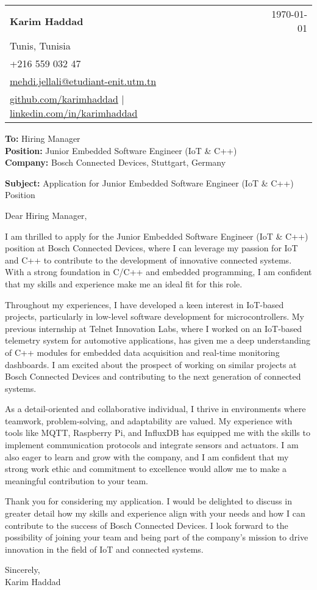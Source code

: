 \documentclass[letterpaper,11pt]{article}
\makeatletter
\newcommand{\letterHeading}[5]{
    \begin{tabular*}{\textwidth}{l@{\extracolsep{\fill}}r}
    \textbf{\Large #1} & #5 \\  %
    #2 & \\
    #3 & \\
    #4 & \\
    \end{tabular*}
    \vspace{15pt}
}
\newcommand{\letterRecipient}[3]{
    \textbf{\large To:} #1 \\
    \textbf{\large Position:} #2 \\
    \textbf{\large Company:} #3 \\
    \vspace{12pt}
}
\newcommand{\letterSubject}[1]{
    \textbf{\large Subject:} #1 \\
    \vspace{15pt}
}
\makeatother
\begin{document}
    \letterHeading
    {Karim Haddad}
    {Tunis, Tunisia}
    {+216 559 032 47 \\ \href{mailto:mehdi.jellali@etudiant-enit.utm.tn}{mehdi.jellali@etudiant-enit.utm.tn}}
    {\href{https://github.com/karimhaddad}{github.com/karimhaddad} $|$ \href{https://www.linkedin.com/in/karimhaddad}{linkedin.com/in/karimhaddad}}
    {\today}

    \letterRecipient
    {Hiring Manager}
    {Junior Embedded Software Engineer (IoT & C++)}
    {Bosch Connected Devices, Stuttgart, Germany}

    \letterSubject{Application for Junior Embedded Software Engineer (IoT & C++) Position}

    Dear Hiring Manager,

    I am thrilled to apply for the Junior Embedded Software Engineer (IoT & C++) position at Bosch Connected Devices, where I can leverage my passion for IoT and C++ to contribute to the development of innovative connected systems. With a strong foundation in C/C++ and embedded programming, I am confident that my skills and experience make me an ideal fit for this role.

    Throughout my experiences, I have developed a keen interest in IoT-based projects, particularly in low-level software development for microcontrollers. My previous internship at Telnet Innovation Labs, where I worked on an IoT-based telemetry system for automotive applications, has given me a deep understanding of C++ modules for embedded data acquisition and real-time monitoring dashboards. I am excited about the prospect of working on similar projects at Bosch Connected Devices and contributing to the next generation of connected systems.

    As a detail-oriented and collaborative individual, I thrive in environments where teamwork, problem-solving, and adaptability are valued. My experience with tools like MQTT, Raspberry Pi, and InfluxDB has equipped me with the skills to implement communication protocols and integrate sensors and actuators. I am also eager to learn and grow with the company, and I am confident that my strong work ethic and commitment to excellence would allow me to make a meaningful contribution to your team.

    Thank you for considering my application. I would be delighted to discuss in greater detail how my skills and experience align with your needs and how I can contribute to the success of Bosch Connected Devices. I look forward to the possibility of joining your team and being part of the company's mission to drive innovation in the field of IoT and connected systems.

    Sincerely,\\[12pt]

    Karim Haddad
\end{document}
